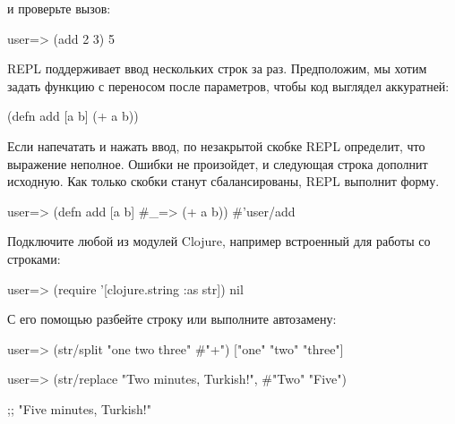 \noindent
и проверьте вызов:

\begin{english}
  \begin{clojure}
user=> (add 2 3)
5
  \end{clojure}
\end{english}

REPL поддерживает ввод нескольких строк за раз. Предположим, мы хотим задать функцию с переносом после параметров, чтобы код выглядел аккуратней:

\begin{english}
  \begin{clojure}
(defn add [a b]
  (+ a b))
  \end{clojure}
\end{english}

Если напечатать  и нажать ввод, по незакрытой скобке REPL определит, что выражение неполное. Ошибки не произойдет, и следующая строка дополнит исходную. Как только скобки станут сбалансированы, REPL выполнит форму.

\begin{english}
  \begin{clojure}
user=> (defn add [a b]
  #_=> (+ a b))
#'user/add
  \end{clojure}
\end{english}

Подключите любой из модулей Clojure, например встроенный  для работы со строками:

\begin{english}
  \begin{clojure}
user=> (require '[clojure.string :as str])
nil
  \end{clojure}
\end{english}

С его помощью разбейте строку или выполните автозамену:

\begin{english}
  \begin{clojure}
user=> (str/split "one two three" #"\s+")
["one" "two" "three"]
  \end{clojure}
\end{english}

\begin{english}
  \begin{clojure}
user=> (str/replace
          "Two minutes, Turkish!",
           #"Two" "Five")

;; "Five minutes, Turkish!"
  \end{clojure}
\end{english}

